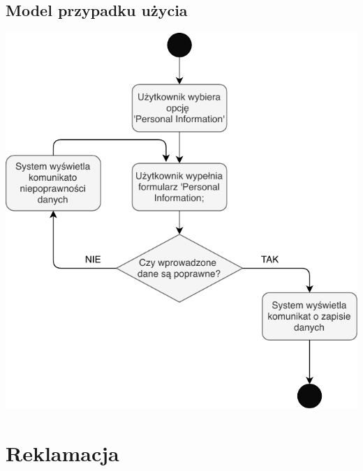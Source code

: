 \documentclass[12pt]{report}
\begin{document}
		\subsection{Model przypadku użycia}
			\begin{center}
				\includegraphics[width=400pt]{edycja.pdf}
			\end{center}
			\newpage

	\section{Reklamacja}
	
\end{document}
